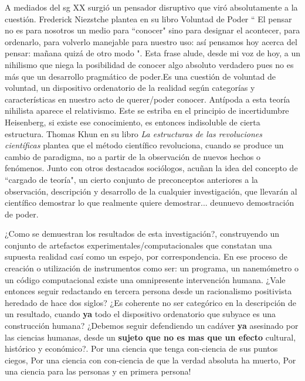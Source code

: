 A mediados del sg XX surgió un pensador disruptivo que viró absolutamente a la cuestión. Frederick Niezstche plantea en su libro Voluntad de Poder \cite{nietzsche2018voluntad} `` El pensar no es para nosotros un medio para ``conocer" sino para designar el acontecer, para ordenarlo, para volverlo manejable para nuestro uso: así pensamos hoy acerca del pensar: mañana quizá de otro modo ". Esta frase alude, desde mi voz de hoy, a un nihilismo que niega la posibilidad de conocer algo absoluto verdadero pues no es más que un desarrollo pragmático de poder.Es una cuestión de voluntad de voluntad, un dispositivo ordenatorio de la realidad según categorías y características en nuestro acto de querer/poder conocer. Antípoda a esta teoría nihilista aparece el relativismo. Este se estriba en el principio de incertidumbre Heisenberg, si existe ese conocimiento, es entonces indisoluble de cierta estructura. Thomas Khun en su libro \emph{La estructuras de las revoluciones científicas} \cite{kuhn2019estructura} plantea que el método científico revoluciona, cuando se produce un cambio de paradigma, no a partir de la observación de nuevos hechos o fenómenos. Junto con otros destacados sociólogos, acuñan la idea del concepto de ``cargado de teoría", un cierto conjunto de preconceptos anteriores a la observación, descripción y desarrollo de la cualquier investigación, que llevarán al científico demostrar lo que realmente quiere demostrar... deunuevo demostración de poder.

¿Como se demuestran los resultados de esta investigación?, construyendo un conjunto de artefactos experimentales/computacionales que constatan una supuesta realidad casí como un espejo, por correspondencia. En ese proceso de creación o utilización de instrumentos como ser: un programa, un nanemómetro o un código computacional existe una omnipresente intervención humana. ¿Vale entonces seguir redactando en tercera persona desde un racionalismo positivista heredado de hace dos siglos? ¿Es coherente no ser categórico en la descripción de un resultado, cuando \textbf{ya} todo el dispositivo ordenatorio que subyace es una construcción humana? ¿Debemos seguir defendiendo un cadáver \textbf{ya} asesinado por las ciencias humanas, desde un \textbf{sujeto que no es mas que un efecto} cultural, histórico y económico?. Por una ciencia que tenga con-ciencia de sus puntos ciegos, Por una ciencia con con-ciencia de que la verdad absoluta ha muerto, Por una ciencia para las personas y en primera persona! 


